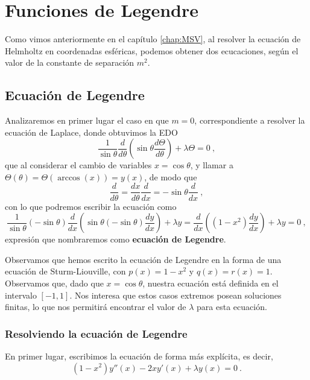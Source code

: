 \chapter{Funciones de Legendre}

Como vimos anteriormente en el capítulo \ref{chap:MSV}, al resolver la ecuación de Helmholtz en coordenadas esféricas, podemos obtener dos ecucaciones, según el valor de la constante de separación $m^2$. 

\section{Ecuación de Legendre}

Analizaremos en primer lugar el caso en que $m=0$, correspondiente a resolver la ecuación de Laplace, donde obtuvimos la EDO
\begin{equation}
    \frac{1}{\sin\theta} \frac{d}{d\theta}\left( \sin\theta \frac{d\Theta}{d\theta} \right) + \lambda \Theta = 0 \ ,
\end{equation}
que al considerar el cambio de variables $x = \cos\theta$, y llamar a $\Theta(\theta) = \Theta(\arccos(x)) = y(x)$, de modo que
\begin{equation}
    \frac{d}{d\theta} = \frac{dx}{d\theta} \frac{d}{dx} = -\sin\theta \frac{d}{dx} \ ,
\end{equation}
con lo que podremos escribir la ecuación como
\begin{equation}
    \frac{1}{\sin\theta}(-\sin\theta)\frac{d}{dx}\left( \sin\theta (-\sin\theta) \frac{dy}{dx} \right) + \lambda y = \frac{d}{dx}\left( (1-x^2) \frac{dy}{dx} \right) + \lambda y = 0 \ ,
\end{equation}
expresión que nombraremos como \textbf{ecuación de Legendre}.

Observamos que hemos escrito la ecuación de Legendre en la forma de una ecuación de Sturm-Liouville, con $p(x) = 1-x^2$ y $q(x) = r(x) = 1$. Observamos que, dado que $x=\cos\theta$, nuestra ecuación está definida en el intervalo $[-1,1]$. Nos interesa que estos casos extremos posean soluciones finitas, lo que nos permitirá encontrar el valor de $\lambda$ para esta ecuación.

\subsection{Resolviendo la ecuación de Legendre}

En primer lugar, escribimos la ecuación de forma más explícita, es decir,
\begin{equation}\label{eq:legendre_explicit}
    (1-x^2)y''(x) - 2x y'(x) + \lambda y(x) = 0 \ .
\end{equation}

